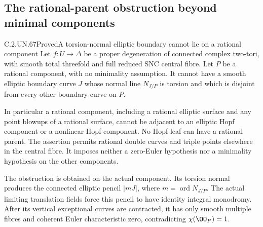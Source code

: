 \subsection{The rational-parent obstruction beyond minimal components}

\begin{statement}{C.2.UN.67}{Proved}{A torsion-normal elliptic boundary cannot lie on a rational component}
Let \(f:U\to\Delta\) be a proper degeneration of connected
complex two-tori, with smooth total threefold and full
reduced SNC central fibre. Let \(P\) be a rational
component, with no minimality assumption. It cannot
have a smooth elliptic boundary curve \(J\) whose normal
line \(N_{J/P}\) is torsion and which is disjoint from
every other boundary curve on \(P\).

In particular a rational component, including a rational
elliptic surface and any point blowups of a rational
surface, cannot be adjacent to an elliptic Hopf component
or a nonlinear Hopf component. No Hopf leaf can have a
rational parent. The assertion permits rational double
curves and triple points elsewhere in the central fibre.
It imposes neither a zero-Euler hypothesis nor a
minimality hypothesis on the other components.

The obstruction is obtained on the actual component.
Its torsion normal produces the connected elliptic
pencil \(|mJ|\), where \(m=\operatorname{ord}N_{J/P}\).
The actual limiting translation fields force this
pencil to have identity integral monodromy. After its
vertical exceptional curves are contracted, it has
only smooth multiple fibres and coherent Euler
characteristic zero, contradicting
\(\chi(\OO_P)=1\).
\end{statement}

